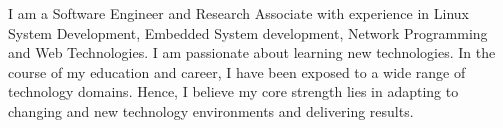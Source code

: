 

\begin{cvparagraph}

I am a Software Engineer and Research Associate with experience in Linux System Development, Embedded System development, Network Programming and Web Technologies. I am passionate about learning new technologies. In the course of my education and career, I have been exposed to a wide range of technology domains. Hence, I believe my core strength lies in adapting to changing and new technology environments and delivering results.
\end{cvparagraph}
